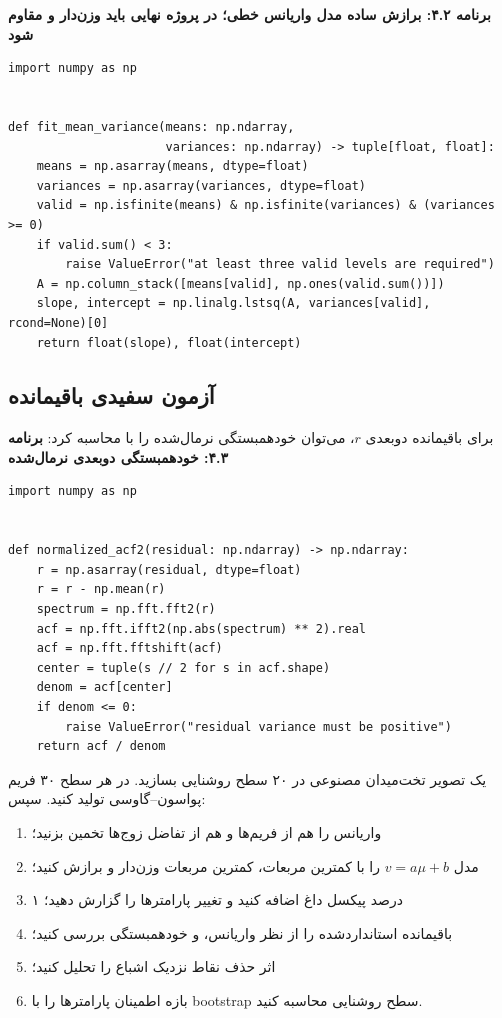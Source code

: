 \documentclass[12pt,openany,oneside]{book}
\begin{document}
\noindent\textbf{برنامه ۴.۲: برازش ساده مدل واریانس خطی؛ در پروژه نهایی باید وزن‌دار و مقاوم شود}\par
\begin{latin}
\begin{lstlisting}
import numpy as np


def fit_mean_variance(means: np.ndarray,
                      variances: np.ndarray) -> tuple[float, float]:
    means = np.asarray(means, dtype=float)
    variances = np.asarray(variances, dtype=float)
    valid = np.isfinite(means) & np.isfinite(variances) & (variances >= 0)
    if valid.sum() < 3:
        raise ValueError("at least three valid levels are required")
    A = np.column_stack([means[valid], np.ones(valid.sum())])
    slope, intercept = np.linalg.lstsq(A, variances[valid], rcond=None)[0]
    return float(slope), float(intercept)
\end{lstlisting}
\end{latin}

\subsection{آزمون سفیدی باقیمانده}

برای باقیمانده دوبعدی \(r\)، می‌توان خودهمبستگی نرمال‌شده را با  محاسبه کرد:
\noindent\textbf{برنامه ۴.۳: خودهمبستگی دوبعدی نرمال‌شده}\par
\begin{latin}
\begin{lstlisting}
import numpy as np


def normalized_acf2(residual: np.ndarray) -> np.ndarray:
    r = np.asarray(residual, dtype=float)
    r = r - np.mean(r)
    spectrum = np.fft.fft2(r)
    acf = np.fft.ifft2(np.abs(spectrum) ** 2).real
    acf = np.fft.fftshift(acf)
    center = tuple(s // 2 for s in acf.shape)
    denom = acf[center]
    if denom <= 0:
        raise ValueError("residual variance must be positive")
    return acf / denom
\end{lstlisting}
\end{latin}

\begin{workshopbox}
یک تصویر تخت‌میدان مصنوعی در ۲۰ سطح روشنایی بسازید. در هر سطح ۳۰ فریم پواسون--گاوسی تولید کنید.
سپس:
\begin{enumerate}
\item واریانس را هم از فریم‌ها و هم از تفاضل زوج‌ها تخمین بزنید؛
\item مدل \(v=a\mu+b\) را با کمترین مربعات، کمترین مربعات وزن‌دار و  برازش کنید؛
\item ۱ درصد پیکسل داغ اضافه کنید و تغییر پارامترها را گزارش دهید؛
\item باقیمانده استانداردشده را از نظر واریانس،  و خودهمبستگی بررسی کنید؛
\item اثر حذف نقاط نزدیک اشباع را تحلیل کنید؛
\item بازه اطمینان پارامترها را با bootstrap سطح روشنایی محاسبه کنید.
\end{enumerate}
\end{workshopbox}
\end{document}
